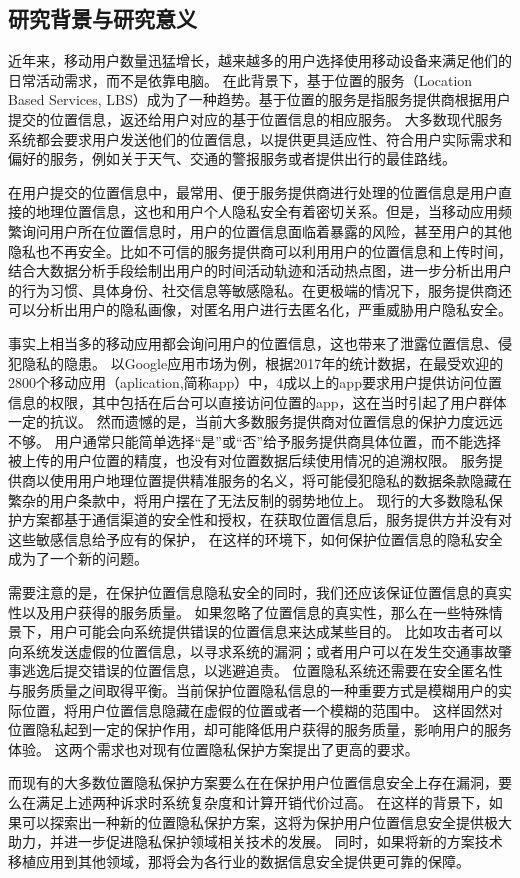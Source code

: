 \documentclass[zihao=-4]{ctexart}
\begin{document}
\subsection{研究背景与研究意义}
近年来，移动用户数量迅猛增长，越来越多的用户选择使用移动设备来满足他们的日常活动需求，而不是依靠电脑。
\cite{czh_1.1}在此背景下，基于位置的服务（Location Based Services, LBS）成为了一种趋势。基于位置的服务是指服务提供商根据用户提交的位置信息，返还给用户对应的基于位置信息的相应服务。
大多数现代服务系统都会要求用户发送他们的位置信息，以提供更具适应性、符合用户实际需求和偏好的服务，例如关于天气、交通的警报服务或者提供出行的最佳路线。\cite{czh_1.2}
\par
在用户提交的位置信息中，最常用、便于服务提供商进行处理的位置信息是用户直接的地理位置信息，这也和用户个人隐私安全有着密切关系。但是，当移动应用频繁询问用户所在位置信息时，用户的位置信息面临着暴露的风险，甚至用户的其他隐私也不再安全。比如不可信的服务提供商可以利用用户的位置信息和上传时间，结合大数据分析手段绘制出用户的时间活动轨迹和活动热点图，进一步分析出用户的行为习惯、具体身份、社交信息等敏感隐私。在更极端的情况下，服务提供商还可以分析出用户的隐私画像，对匿名用户进行去匿名化，严重威胁用户隐私安全。
\par
事实上相当多的移动应用都会询问用户的位置信息，这也带来了泄露位置信息、侵犯隐私的隐患。
以Google应用市场为例，根据2017年的统计数据，在最受欢迎的2800个移动应用（aplication,简称app）中，4成以上的app要求用户提供访问位置信息的权限，其中包括在后台可以直接访问位置的app，\cite{czh_1.3}这在当时引起了用户群体一定的抗议。
然而遗憾的是，当前大多数服务提供商对位置信息的保护力度远远不够。
用户通常只能简单选择“是”或“否”给予服务提供商具体位置，而不能选择被上传的用户位置的精度，也没有对位置数据后续使用情况的追溯权限。
服务提供商以使用用户地理位置提供精准服务的名义，将可能侵犯隐私的数据条款隐藏在繁杂的用户条款中，将用户摆在了无法反制的弱势地位上。
现行的大多数隐私保护方案都基于通信渠道的安全性和授权，在获取位置信息后，服务提供方并没有对这些敏感信息给予应有的保护，
\cite{czh_1.4}在这样的环境下，如何保护位置信息的隐私安全成为了一个新的问题。
\par
需要注意的是，在保护位置信息隐私安全的同时，我们还应该保证位置信息的真实性以及用户获得的服务质量。
如果忽略了位置信息的真实性，那么在一些特殊情景下，用户可能会向系统提供错误的位置信息来达成某些目的。
比如攻击者可以向系统发送虚假的位置信息，以寻求系统的漏洞；或者用户可以在发生交通事故肇事逃逸后提交错误的位置信息，以逃避追责\cite{czh_1.5}。
位置隐私系统还需要在安全匿名性与服务质量之间取得平衡。当前保护位置隐私信息的一种重要方式是模糊用户的实际位置，将用户位置信息隐藏在虚假的位置或者一个模糊的范围中。
这样固然对位置隐私起到一定的保护作用，却可能降低用户获得的服务质量，影响用户的服务体验。
这两个需求也对现有位置隐私保护方案提出了更高的要求。
\par
而现有的大多数位置隐私保护方案要么在在保护用户位置信息安全上存在漏洞，要么在满足上述两种诉求时系统复杂度和计算开销代价过高。
在这样的背景下，如果可以探索出一种新的位置隐私保护方案，这将为保护用户位置信息安全提供极大助力，并进一步促进隐私保护领域相关技术的发展。
同时，如果将新的方案技术移植应用到其他领域，那将会为各行业的数据信息安全提供更可靠的保障。
\end{document}
